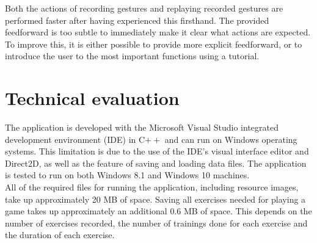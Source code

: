 Both the actions of recording gestures and replaying recorded gestures are performed faster after having experienced this firsthand. The provided feedforward is too subtle to immediately make it clear what actions are expected. To improve this, it is either possible to provide more explicit feedforward, or to introduce the user to the most important functions using a tutorial.\\


\section{Technical evaluation}

The application is developed with the Microsoft Visual Studio integrated development environment (IDE) in C$++$ and can run on Windows operating systems. This limitation is due to the use of the IDE's visual interface editor and Direct2D, as well as the feature of saving and loading data files. The application is tested to run on both Windows 8.1 and Windows 10 machines.\\

All of the required files for running the application, including resource images, take up approximately 20 MB of space. Saving all exercises needed for playing a game takes up approximately an additional 0.6 MB of space. This depends on the number of exercises recorded, the number of trainings done for each exercise and the duration of each exercise.\\

